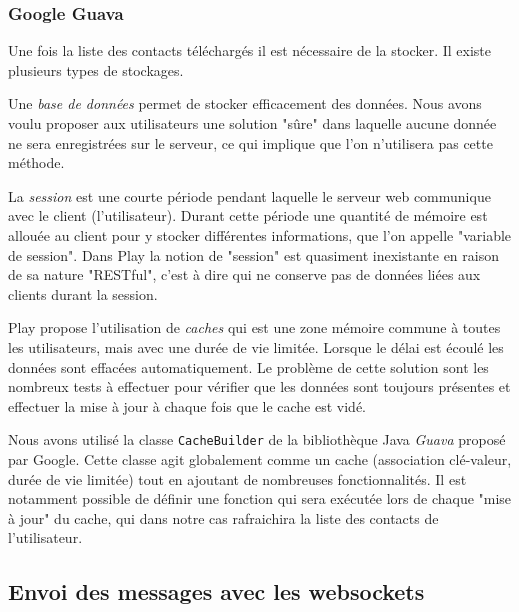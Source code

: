 \subsubsection{Google Guava}

Une fois la liste des contacts téléchargés il est nécessaire de la stocker.
Il existe plusieurs types de stockages.

Une \textit{base de données} permet de stocker efficacement des données.
Nous avons voulu proposer aux utilisateurs une solution "sûre" dans laquelle aucune donnée ne sera enregistrées sur le serveur, ce qui implique que l'on n'utilisera pas cette méthode.

La \textit{session} est une courte période pendant laquelle le serveur web communique avec le client (l'utilisateur).
Durant cette période une quantité de mémoire est allouée au client pour y stocker différentes informations, que l'on appelle "variable de session".
Dans Play la notion de "session" est quasiment inexistante en raison de sa nature "RESTful", c'est à dire qui ne conserve pas de données liées aux clients durant la session.

Play propose l'utilisation de \textit{caches} qui est une zone mémoire commune à toutes les utilisateurs, mais avec une durée de vie limitée.
Lorsque le délai est écoulé les données sont effacées automatiquement.
Le problème de cette solution sont les nombreux tests à effectuer pour vérifier que les données sont toujours présentes et effectuer la mise à jour à chaque fois que le cache est vidé.

Nous avons utilisé la classe \lstinline{CacheBuilder} de la bibliothèque Java \textit{Guava} proposé par Google.
Cette classe agit globalement comme un cache (association clé-valeur, durée de vie limitée) tout en ajoutant de nombreuses fonctionnalités.
Il est notamment possible de définir une fonction qui sera exécutée lors de chaque "mise à jour" du cache, qui dans notre cas rafraichira la liste des contacts de l'utilisateur.
\\



\subsection{Envoi des messages avec les websockets}

